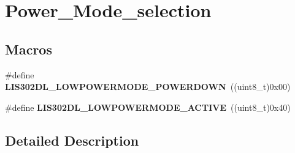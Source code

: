 \hypertarget{group___power___mode__selection}{\section{Power\-\_\-\-Mode\-\_\-selection}
\label{group___power___mode__selection}
}
\subsection*{Macros}
\begin{DoxyCompactItemize}
\item 
\hypertarget{group___power___mode__selection_ga88c07b8b0a7c1795504323f6d4aebee4}{\#define {\bfseries L\-I\-S302\-D\-L\-\_\-\-L\-O\-W\-P\-O\-W\-E\-R\-M\-O\-D\-E\-\_\-\-P\-O\-W\-E\-R\-D\-O\-W\-N}~((uint8\-\_\-t)0x00)}\label{group___power___mode__selection_ga88c07b8b0a7c1795504323f6d4aebee4}

\item 
\hypertarget{group___power___mode__selection_gab38b583823d2c0a93e5a9359917b3f51}{\#define {\bfseries L\-I\-S302\-D\-L\-\_\-\-L\-O\-W\-P\-O\-W\-E\-R\-M\-O\-D\-E\-\_\-\-A\-C\-T\-I\-V\-E}~((uint8\-\_\-t)0x40)}\label{group___power___mode__selection_gab38b583823d2c0a93e5a9359917b3f51}

\end{DoxyCompactItemize}


\subsection{Detailed Description}
